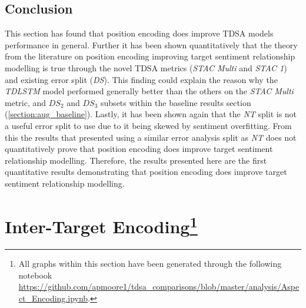 \subsection{Conclusion}
This section has found that position encoding does improve TDSA models performance in general. Further it has been shown quantitatively that the theory from the literature on position encoding improving target sentiment relationship modelling \citep{li-etal-2018-hierarchical, he-etal-2018-effective} is true through the novel TDSA metrics (\textit{STAC Multi} and \textit{STAC 1}) and existing error split (\textit{DS}). This finding could explain the reason why the \textit{TDLSTM} model performed generally better than the others on the \textit{STAC Multi} metric, and $DS_2$ and $DS_3$ subsets within the baseline results section (\ref{section:aug_baseline}). Lastly, it has been shown again that the \textit{NT} split is not a useful error split to use due to it being skewed by sentiment overfitting. From this the results that \citet{he-etal-2018-effective} presented using a similar error analysis split as \textit{NT} does not quantitatively prove that position encoding does improve target sentiment relationship modelling. Therefore, the results presented here are the first quantitative results demonstrating that position encoding does improve target sentiment relationship modelling.

\FloatBarrier
\section[Inter-Target Encoding]{Inter-Target Encoding\footnote{All graphs within this section have been generated through the following notebook \url{https://github.com/apmoore1/tdsa_comparisons/blob/master/analysis/Aspect_Encoding.ipynb}.}}
\label{section:aug_inter_target_encoding}
